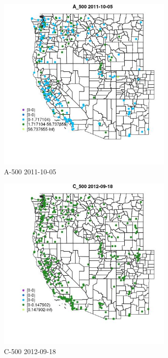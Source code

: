 \begin{figure} 
\centering  
\includegraphics[width=0.77\textwidth]{Code_Outputs/ML_input_report_ML_input_PM25_Step5_part_d_de_duplicated_aves_ML_input_MapObsA_5002011-10-05.jpg} 
\caption{\label{fig:ML_input_report_ML_input_PM25_Step5_part_d_de_duplicated_aves_ML_inputMapObsA_5002011-10-05}A-500 2011-10-05} 
\end{figure} 
 

\begin{figure} 
\centering  
\includegraphics[width=0.77\textwidth]{Code_Outputs/ML_input_report_ML_input_PM25_Step5_part_d_de_duplicated_aves_ML_input_MapObsC_5002012-09-18.jpg} 
\caption{\label{fig:ML_input_report_ML_input_PM25_Step5_part_d_de_duplicated_aves_ML_inputMapObsC_5002012-09-18}C-500 2012-09-18} 
\end{figure} 
 

